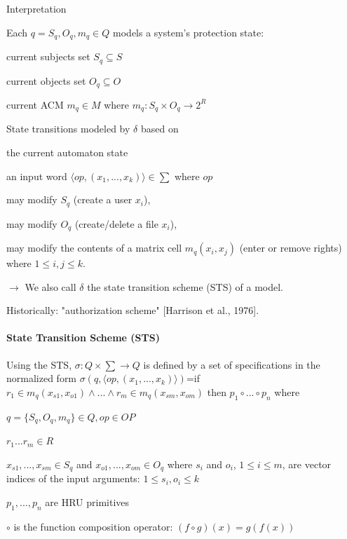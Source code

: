 \documentclass[a4paper]{article}
\begin{document}
\begin{multicols}{3}
    Interpretation
    \begin{itemize*}
        \item Each $q=S_q,O_q,m_q\in Q$ models a system’s protection state:
        \begin{itemize*}
            \item current subjects set $S_q\subseteq S$
            \item current objects set $O_q\subseteq O$
            \item current ACM $m_q\in M$ where $m_q:S_q\times O_q\rightarrow 2^R$
        \end{itemize*}
        \item State transitions modeled by $\delta$ based on
        \begin{itemize*}
            \item the current automaton state
            \item an input word $⟨op,(x_1,...,x_k)⟩\in\sum$ where $op$
            \item may modify $S_q$ (create a user $x_i$),
            \item may modify $O_q$ (create/delete a file $x_i$),
            \item may modify the contents of a matrix cell $m_q(x_i,x_j)$ (enter or remove rights) where $1\leq i,j\leq k$.
            \item $\rightarrow$  We also call $\delta$ the state transition scheme (STS) of a model.
            \item Historically: "authorization scheme" [Harrison et al., 1976].
        \end{itemize*}
    \end{itemize*}

    \paragraph{State Transition Scheme (STS)}
    Using the STS, $\sigma:Q\times\sum\rightarrow Q$ is defined by a set of specifications in the normalized form
    $\sigma(q,⟨op,(x_1,...,x_k)⟩)$=if $r_1\in m_q(x_{s1},x_{o1}) \wedge ... \wedge r_m\in m_q(x_{sm},x_{om})$ then $p_1\circ ...\circ p_n$ where
    \begin{itemize*}
        \item $q=\{S_q,O_q,m_q\}\in Q,op\in OP$
        \item $r_1 ...r_m\in R$
        \item $x_{s1},...,x_{sm}\in S_q$ and $x_{o1},...,x_{om}\in O_q$ where $s_i$ and $o_i$, $1\leq i\leq m$, are vector indices of the input arguments: $1\leq s_i,o_i\leq k$
        \item $p_1,...,p_n$ are HRU primitives
        \item $\circ$ is the function composition operator: $(f\circ g)(x)=g(f(x))$
    \end{itemize*}


\end{multicols}
\end{document}
